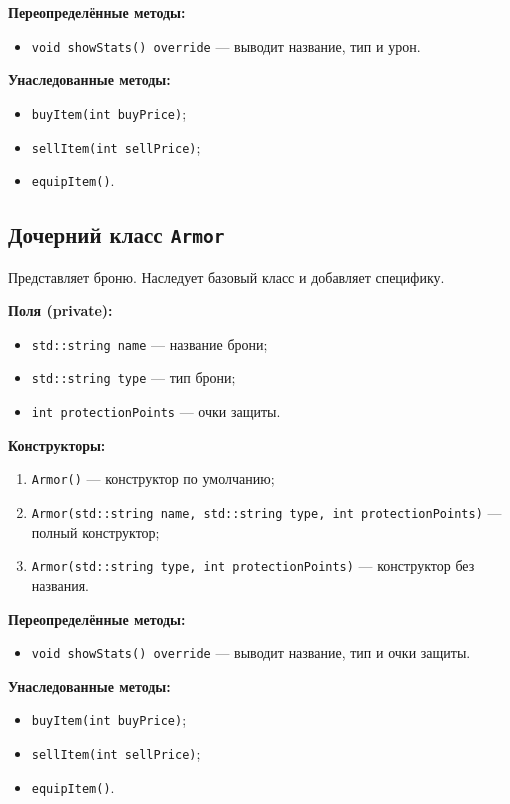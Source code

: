 \documentclass[oneside,a4paper,14pt]{extarticle}
\begin{document}
\textbf{Переопределённые методы:}
\begin{itemize}
    \item \texttt{void showStats() override} — выводит название, тип и урон.
\end{itemize}

\textbf{Унаследованные методы:}
\begin{itemize}
    \item \texttt{buyItem(int buyPrice)};
    \item \texttt{sellItem(int sellPrice)};
    \item \texttt{equipItem()}.
\end{itemize}

\subsection*{Дочерний класс \texttt{Armor}}
Представляет броню. Наследует базовый класс и добавляет специфику.

\textbf{Поля (private):}
\begin{itemize}
    \item \texttt{std::string name} — название брони;
    \item \texttt{std::string type} — тип брони;
    \item \texttt{int protectionPoints} — очки защиты.
\end{itemize}

\textbf{Конструкторы:}
\begin{enumerate}
    \item \texttt{Armor()} — конструктор по умолчанию;
    \item \texttt{Armor(std::string name, std::string type, int protectionPoints)} — полный конструктор;
    \item \texttt{Armor(std::string type, int protectionPoints)} — конструктор без названия.
\end{enumerate}

\textbf{Переопределённые методы:}
\begin{itemize}
    \item \texttt{void showStats() override} — выводит название, тип и очки защиты.
\end{itemize}

\textbf{Унаследованные методы:}
\begin{itemize}
    \item \texttt{buyItem(int buyPrice)};
    \item \texttt{sellItem(int sellPrice)};
    \item \texttt{equipItem()}.
\end{itemize}
\end{document}

